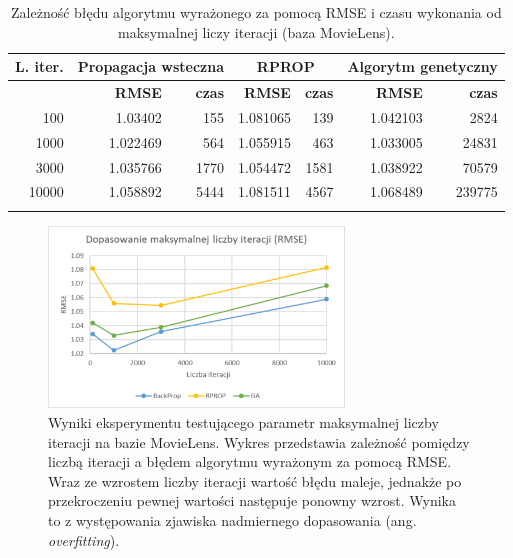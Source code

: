 \documentclass[twoside]{iisthesis}
\begin{document}
				\begin{longtable}[H]{r||rr|rr|rr}		
					\label{tab:expiterations}		
					\textbf{L. iter.} & \multicolumn{2}{c|}{\textbf{Propagacja wsteczna}}  & \multicolumn{2}{c|}{\textbf{RPROP}} & \multicolumn{2}{c}{\textbf{Algorytm genetyczny}}  \\
					\hline
					& \textbf{RMSE} & \textbf{czas} & \textbf{RMSE} & \textbf{czas} & \textbf{RMSE} & \textbf{czas} \\
					\hline
					100 & 1.03402 & 155 & 1.081065 & 139 & 1.042103 & 2824 \\
					1000  & 1.022469 & 564 & 1.055915 & 463 & 1.033005 & 24831  \\
					3000  & 1.035766 & 1770 & 1.054472 & 1581  & 1.038922 & 70579  \\
					10000 & 1.058892  & 5444 & 1.081511  & 4567  & 1.068489 & 239775 \\
					\caption{Zależność błędu algorytmu wyrażonego za pomocą RMSE i czasu wykonania od maksymalnej liczy iteracji (baza MovieLens).}
				\end{longtable}
				
				\begin{figure}[!ht]
					\centering
					\includegraphics[width=0.7\textwidth]{expiterations_rmse}			
					\caption{Wyniki eksperymentu testującego parametr maksymalnej liczby iteracji na bazie MovieLens. Wykres przedstawia zależność pomiędzy liczbą iteracji a błędem algorytmu wyrażonym za pomocą RMSE. Wraz ze wzrostem liczby iteracji wartość błędu maleje, jednakże po przekroczeniu pewnej wartości następuje ponowny wzrost. Wynika to z występowania zjawiska nadmiernego dopasowania (ang. \textit{overfitting}). }
					\label{fig:expiterations_rmse}
				\end{figure}
			
\end{document}
